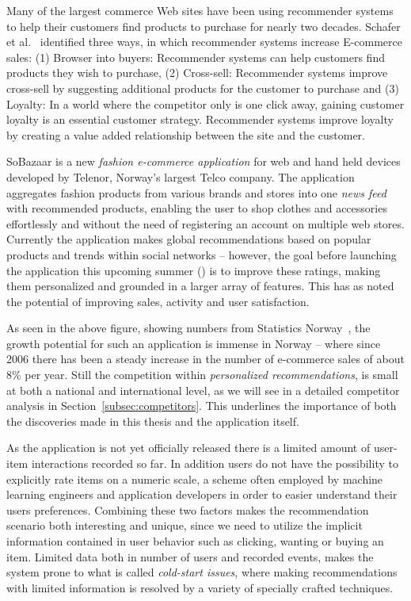 Many of the largest commerce Web sites have been using recommender systems to
help their customers find products to purchase for nearly two decades.
Schafer et al.~\cite{Schafer1999} identified three ways, in which recommender
systems increase E-commerce sales: (1) Browser into buyers: Recommender systems
can help customers find products they wish to purchase, (2) Cross-sell:
Recommender systems improve cross-sell by suggesting additional products for
the customer to purchase and (3) Loyalty: In a world where the competitor only
is one click away, gaining customer loyalty is an essential customer strategy.
Recommender systems improve loyalty by creating a value added relationship
between the site and the customer.

SoBazaar is a new \textit{fashion e-commerce application} for web and hand held
devices developed by Telenor, Norway's largest Telco company. The application
aggregates fashion products from various brands and stores into one \emph{news
feed} with recommended products, enabling the user to shop clothes and
accessories effortlessly and without the need of registering an account on
multiple web stores. Currently the application makes global recommendations
based on popular products and trends within social networks -- however, the goal
before launching the application this upcoming summer (\the\year) is to improve
these ratings, making them personalized and grounded in a larger array of
features. This has as noted the potential of improving sales, activity and user
satisfaction.

\ecommercenorway{}

As seen in the above figure, showing numbers from Statistics
Norway~\cite{statisticsNorway}, the growth potential for such an application is
immense in Norway -- where since 2006 there has been a steady increase in the
number of e-commerce sales of about 8\% per year. Still the competition within
\textit{personalized recommendations}, is small at both a national and
international level, as we will see in a detailed competitor analysis in
Section~\ref{subsec:competitors}. This underlines the importance of both the
discoveries made in this thesis and the application itself.

As the application is not yet officially released there is a limited amount of
user-item interactions recorded so far. In addition users do not have the
possibility to explicitly rate items on a numeric scale, a scheme often
employed by machine learning engineers and application developers in order to
easier understand their users preferences. Combining these two factors makes
the recommendation scenario both interesting and unique, since we need to
utilize the implicit information contained in user behavior such as clicking,
wanting or buying an item. Limited data both in number of users and recorded
events, makes the system prone to what is called \textit{cold-start issues},
where making recommendations with limited information is resolved by a variety
of specially crafted techniques.

